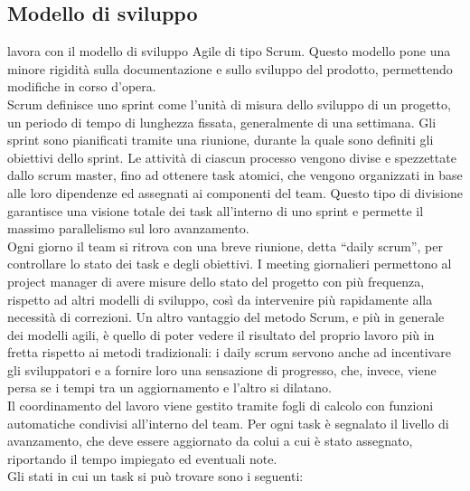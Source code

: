    \subsection{Modello di sviluppo}
   \nomeAzienda{} lavora con il modello di sviluppo Agile di tipo Scrum. Questo modello pone una minore rigidità sulla documentazione e sullo sviluppo del prodotto, permettendo modifiche in corso d'opera.
   \\
   Scrum definisce uno sprint come l'unità di misura dello sviluppo di un progetto, un periodo di tempo di lunghezza fissata, generalmente di una settimana.
   Gli sprint sono pianificati tramite una riunione, durante la quale sono definiti gli obiettivi dello sprint. Le attività di ciascun processo vengono divise e spezzettate dallo scrum master, fino ad ottenere task atomici, che vengono organizzati in base alle loro dipendenze ed assegnati ai componenti del team. Questo tipo di divisione garantisce una visione totale dei task all'interno di uno sprint e permette il massimo parallelismo sul loro avanzamento.
   \\
   Ogni giorno il team si ritrova con una breve riunione, detta ``daily scrum'', per controllare lo stato dei task e degli obiettivi. I meeting giornalieri permettono al project manager di avere misure dello stato del progetto con più frequenza, rispetto ad altri modelli di sviluppo, così da intervenire più rapidamente alla necessità di correzioni. 
   Un altro vantaggio del metodo Scrum, e più in generale dei modelli agili, è quello di poter vedere il risultato del proprio lavoro più in fretta rispetto ai metodi tradizionali: i daily scrum servono anche ad incentivare gli sviluppatori e a fornire loro una sensazione di progresso, che, invece, viene persa se i tempi tra un aggiornamento e l'altro si dilatano.
   \\
   Il coordinamento del lavoro viene gestito tramite fogli di calcolo con funzioni automatiche condivisi all'interno del team. Per ogni task è segnalato il livello di avanzamento, che deve essere aggiornato da colui a cui è stato assegnato, riportando il tempo impiegato ed eventuali note.
   \\
   Gli stati in cui un task si può trovare sono i seguenti:
